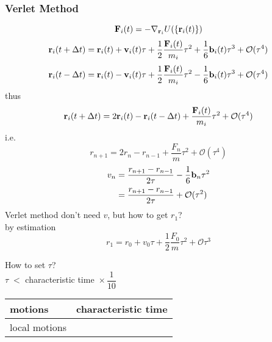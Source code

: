 \documentclass[UTF8]{ctexart} %
\DeclareMathOperator{\ti}{\times}
\numberwithin{equation}{section}
\begin{document}
\subsubsection{Verlet Method}
\begin{equation}\label{key}
\vb{F}_i(t) = -\nabla_{\vb{r}_i} U(\{\vb{r}_i(t)\})
\end{equation}
\begin{equation}\label{key}
\vb{r}_i(t+\Delta t) = \vb{r}_i(t) + \vb{v}_i(t)\tau + \dfrac{1}{2}\dfrac{\vb{F}_i(t)}{m_i}\tau^2 + \dfrac{1}{6}\vb{b}_i(t)\tau^3 + \mathcal{O}(\tau^4)
\end{equation}
\begin{equation}\label{key}
\vb{r}_i(t-\Delta t) = \vb{r}_i(t) - \vb{v}_i(t)\tau + \dfrac{1}{2}\dfrac{\vb{F}_i(t)}{m_i}\tau^2 - \dfrac{1}{6}\vb{b}_i(t)\tau^3 + \mathcal{O}(\tau^4)
\end{equation}
thus
\begin{equation}\label{key}
\vb{r}_i(t+\Delta t) = 2\vb{r}_i(t) - \vb{r}_i(t-\Delta t) + \dfrac{\vb{F}_i(t)}{m_i}\tau^2 + \mathcal{O}(\tau^4)
\end{equation}
i.e.
\begin{equation}\label{key}
r_{n+1} = 2 r_n - r_{n-1} + \dfrac{F_n}{m}\tau^2 + \mathcal{O}(\tau^4)
\end{equation}
\begin{equation}\label{key}
\begin{aligned}
v_n &= \dfrac{r_{n+1} - r_{n-1}}{2\tau} - \dfrac{1}{6}\vb{b}_n\tau^2\\
&= \dfrac{r_{n+1} - r_{n-1}}{2\tau} + \mathcal{O}(\tau^2)
\end{aligned}
\end{equation}
Verlet method don't need $ v $, but how to get $ r_{1} $?\\
by estimation
\begin{equation}\label{key}
r_1 = r_0 + v_0\tau + \dfrac{1}{2}\dfrac{F_0}{m}\tau^2 +\mathcal{O}\tau^3
\end{equation}

How to set $ \tau $?\\
$ \tau \; <$ characteristic time $ \ti\dfrac{1}{10} $\\
\begin{tabular}{|l|l|}
	\hline
	motions & characteristic time\\
	\hline
	local motions
\end{tabular}
\end{document}
